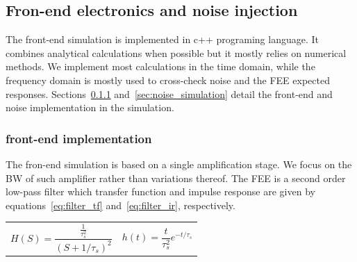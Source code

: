 \documentclass[preprint,1p]{elsarticle}
\begin{document}

\subsection{Fron-end electronics and noise injection}
\label{sub_sec:fee_simulation_and_noise}
The front-end simulation is implemented in c++ programing language. It combines analytical calculations when possible but
it mostly relies on numerical methods. We implement most calculations in the time domain, while the frequency domain is mostly used
to cross-check noise and the FEE expected responses. Sections~\ref{sec:fee} and~\ref{sec:noise_simulation} detail the front-end and
noise implementation in the simulation.

\subsubsection{front-end implementation}\label{sec:fee}
The fron-end simulation is based on a single amplification stage. We focus on the BW of such amplifier rather than variations
thereof. The FEE is a second order low-pass filter which transfer function
and impulse response are given by equations~\ref{eq:filter_tf} and~\ref{eq:filter_ir}, respectively.


 \begin{tabularx}{\textwidth}{XX}
 \begin{equation}\label{eq:filter_tf}
   H(S) = \frac{\frac{1}{\tau_{s}^{2}}}{(S+1/\tau_{s})^{2}}
 \end{equation}
     &
 \begin{equation}\label{eq:filter_ir}
     h(t) = \frac{t}{\tau_s^2}e^{-t/\tau_{s}}
 \end{equation}
 \end{tabularx}\par
\end{document}
